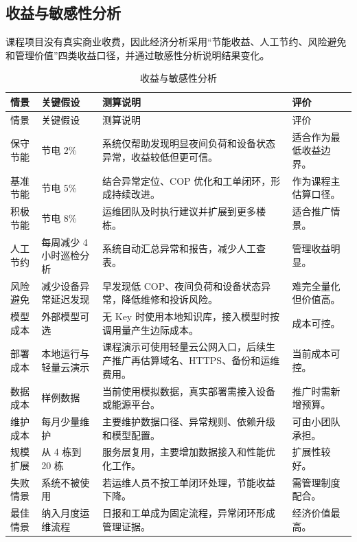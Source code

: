 \documentclass[12pt,a4paper]{ctexart}
\begin{document}
\subsection{收益与敏感性分析}
课程项目没有真实商业收费，因此经济分析采用“节能收益、人工节约、风险避免和管理价值”四类收益口径，并通过敏感性分析说明结果变化。
\begin{longtable}{L{2.4cm}L{3.0cm}L{5.6cm}L{3.8cm}}
\caption{收益与敏感性分析}\\
\toprule
情景 & 关键假设 & 测算说明 & 评价 \\
\midrule
\endfirsthead
\toprule
情景 & 关键假设 & 测算说明 & 评价 \\
\midrule
\endhead
保守节能 & 节电 2\% & 系统仅帮助发现明显夜间负荷和设备状态异常，收益较低但更可信。 & 适合作为最低收益边界。 \\
基准节能 & 节电 5\% & 结合异常定位、COP 优化和工单闭环，形成持续改进。 & 作为课程主估算口径。 \\
积极节能 & 节电 8\% & 运维团队及时执行建议并扩展到更多楼栋。 & 适合推广情景。 \\
人工节约 & 每周减少 4 小时巡检分析 & 系统自动汇总异常和报告，减少人工查表。 & 管理收益明显。 \\
风险避免 & 减少设备异常延迟发现 & 早发现低 COP、夜间负荷和设备状态异常，降低维修和投诉风险。 & 难完全量化但价值高。 \\
模型成本 & 外部模型可选 & 无 Key 时使用本地知识库，接入模型时按调用量产生边际成本。 & 成本可控。 \\
部署成本 & 本地运行与轻量云演示 & 课程演示可使用轻量云公网入口，后续生产推广再估算域名、HTTPS、备份和运维费用。 & 当前成本可控。 \\
数据成本 & 样例数据 & 当前使用模拟数据，真实部署需接入设备或能源平台。 & 推广时需新增预算。 \\
维护成本 & 每月少量维护 & 主要维护数据口径、异常规则、依赖升级和模型配置。 & 可由小团队承担。 \\
规模扩展 & 从 4 栋到 20 栋 & 服务层复用，主要增加数据接入和性能优化工作。 & 扩展性较好。 \\
失败情景 & 系统不被使用 & 若运维人员不按工单闭环处理，节能收益下降。 & 需管理制度配合。 \\
最佳情景 & 纳入月度运维流程 & 日报和工单成为固定流程，异常闭环形成管理证据。 & 经济价值最高。 \\
\bottomrule
\end{longtable}
\end{document}

